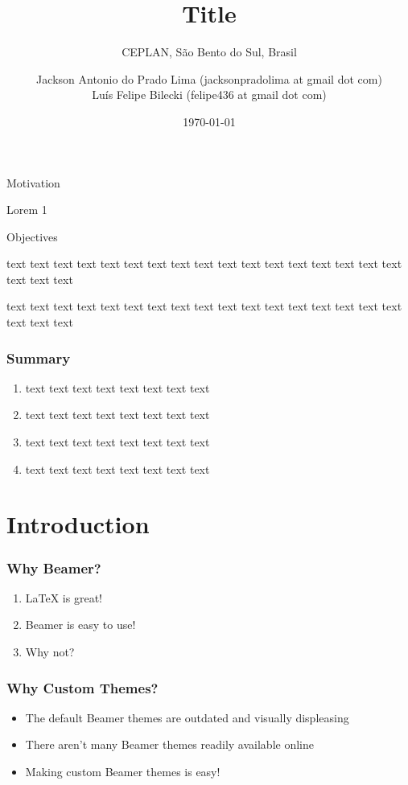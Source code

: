 \documentclass[aspectratio=169]{beamer}
\title{Title}
\author{Jackson Antonio do Prado Lima (jacksonpradolima at gmail dot com) \\   Luís Felipe Bilecki (felipe436 at gmail dot com)}
\date{\today}
\subtitle{\tiny{CEPLAN, São Bento do Sul, Brasil}}
\begin{document}
	\frame{\titlepage}
	
	\begin{frame}{Motivation}
		\begin{block}{Lorem 1}
			\blindtext
		\end{block}
	\end{frame}
	
	\begin{frame}{Objectives}
		\begin{block}{text text text text}
			text text text text text text text text text text text text text text text text
		\end{block}
		\begin{block}{text text text text}
			text text text text text text text text text text text text text text text text
		\end{block}
	\end{frame}
	
	\begin{frame}
		\frametitle{Summary}
		\begin{enumerate}
			\item text text text text text text text text
			\item text text text text text text text text
			\item text text text text text text text text
			\item text text text text text text text text
		\end{enumerate}
	\end{frame}
	
	\startprogressbar
	
	\section{Introduction}
		\begin{frame}
			\frametitle{Why Beamer?}
			\begin{enumerate}
				\item LaTeX is great!
				\item Beamer is easy to use!
				\item Why not?
			\end{enumerate}
		\end{frame}

		\begin{frame}
			\frametitle{Why Custom Themes?}
			\begin{itemize}
				\item The default Beamer themes are outdated and visually displeasing
				\item There aren't many Beamer themes readily available online
				\item Making custom Beamer themes is easy!
			\end{itemize}
		\end{frame}
\end{document}
